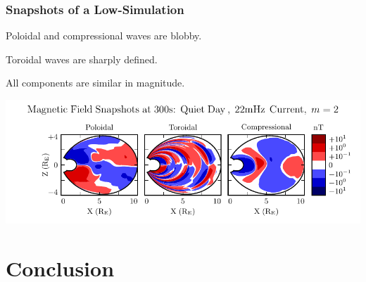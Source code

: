 \documentclass{beamer}
\begin{document}
\begin{frame}
\frametitle{Snapshots of a Low-\azm Simulation}

\begin{wideitemize}
\item Poloidal and compressional waves are blobby. 
\item Toroidal waves are sharply defined. 
\item All components are similar in magnitude. 
\end{wideitemize}

\vfill

\includegraphics[width=\textwidth]{figures/snapshot_smallm.pdf}

\end{frame}


\section{Conclusion}

\end{document}
